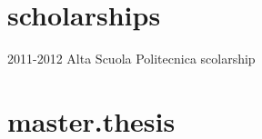 \documentclass[]{friggeri-cv} %
\begin{document}
\section{scholarships}
\begin{entrylist}

\entry
{2011-2012}
{Alta Scuola Politecnica scolarship}
{}
{}
\end{entrylist}


\section{master.thesis}
\end{document}
